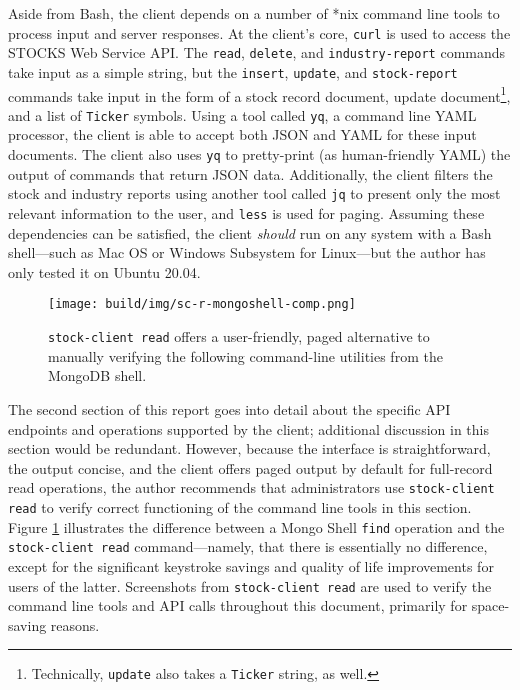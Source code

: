 \documentclass[
11pt,
titlepage,
]{article}
\begin{document}
Aside from Bash, the client depends on a number of *nix command line tools to
process input and server responses. At the client's core, \texttt{curl} is used
to access the STOCKS Web Service API. The \texttt{read}, \texttt{delete}, and
\texttt{industry-report} commands take input as a simple string, but the
\texttt{insert}, \texttt{update}, and \texttt{stock-report} commands take input
in the form of a stock record document, update document\footnote{Technically,
\texttt{update} also takes a \texttt{Ticker} string, as well.}, and a list of
\texttt{Ticker} symbols. Using a tool called \texttt{yq}, a command line YAML
processor, the client is able to accept both JSON and YAML for these input
documents. The client also uses \texttt{yq} to pretty-print (as human-friendly
YAML) the output of commands that return JSON data. Additionally, the client
filters the stock and industry reports using another tool called \texttt{jq} to
present only the most relevant information to the user, and \texttt{less} is
used for paging. Assuming these dependencies can be satisfied, the client
\textit{should} run on any system with a Bash shell---such as Mac OS or Windows
Subsystem for Linux---but the author has only tested it on Ubuntu 20.04.

\begin{figure}[tbp]
  \texttt{[image: build/img/sc-r-mongoshell-comp.png]}
  \caption{\texttt{stock-client read} offers a user-friendly, paged alternative
    to manually verifying the following command-line utilities from the MongoDB
    shell.}
  \label{fig:sc-r-mongoshell-comp}
\end{figure}

The second section of this report goes into detail about the specific API
endpoints and operations supported by the client; additional discussion in this
section would be redundant. However, because the interface is straightforward,
the output concise, and the client offers paged output by default for
full-record read operations, the author recommends that administrators use
\texttt{stock-client read} to verify correct functioning of the command line
tools in this section. Figure \ref{fig:sc-r-mongoshell-comp} illustrates the
difference between a Mongo Shell \texttt{find} operation and the
\texttt{stock-client read} command---namely, that there is essentially no
difference, except for the significant keystroke savings and quality of life
improvements for users of the latter. Screenshots from \texttt{stock-client
read} are used to verify the command line tools and API calls throughout this
document, primarily for space-saving reasons.
\end{document}
